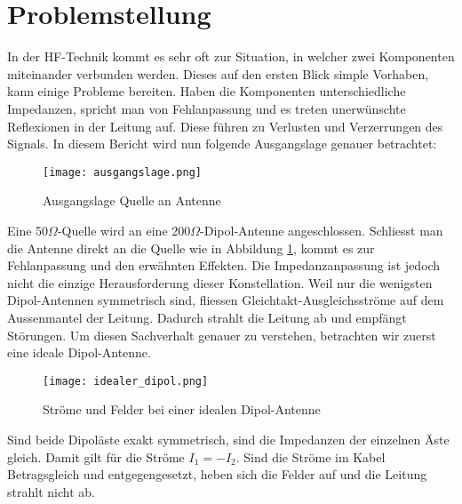 \section{Problemstellung}
In der HF-Technik kommt es sehr oft zur Situation, in welcher zwei Komponenten miteinander verbunden werden. Dieses auf den ersten Blick simple Vorhaben, kann einige Probleme bereiten. Haben die Komponenten unterschiedliche Impedanzen, spricht man von Fehlanpassung und es treten unerwünschte Reflexionen in der Leitung auf. Diese führen zu Verlusten und Verzerrungen des Signals. In diesem Bericht wird nun folgende Ausgangslage genauer betrachtet:
\begin{figure}[h]
	\centering
	\texttt{[image: ausgangslage.png]}
	\caption{Ausgangslage Quelle an Antenne}\label{fig:ausgangslage}
\end{figure}

Eine 50$\Omega$-Quelle wird an eine 200$\Omega$-Dipol-Antenne angeschlossen. Schliesst man die Antenne direkt an die Quelle wie in Abbildung \ref{fig:ausgangslage}, kommt es zur Fehlanpassung und den erwähnten Effekten. Die Impedanzanpassung ist jedoch nicht die einzige Herausforderung dieser Konstellation.
\newline
Weil nur die wenigsten Dipol-Antennen symmetrisch sind, fliessen Gleichtakt-Ausgleichsströme auf dem Aussenmantel der Leitung. Dadurch strahlt die Leitung ab und empfängt Störungen. Um diesen Sachverhalt genauer zu verstehen, betrachten wir zuerst eine ideale Dipol-Antenne.

\begin{figure}[H]
	\centering
	\texttt{[image: idealer\_dipol.png]}
	\caption{Ströme und Felder bei einer idealen Dipol-Antenne}\label{fig:idealer_dipol}
\end{figure}

Sind beide Dipoläste exakt symmetrisch, sind die Impedanzen der einzelnen Äste gleich. Damit gilt für die Ströme $I_{1}=-I_{2}$. Sind die Ströme im Kabel Betragsgleich und entgegengesetzt, heben sich die Felder auf und die Leitung strahlt nicht ab.



